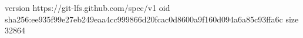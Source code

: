 version https://git-lfs.github.com/spec/v1
oid sha256:ee935f99e27eb249eaa4cc999866d20fcac0d8600a9f160d094a6a85c93ffa6c
size 32864
